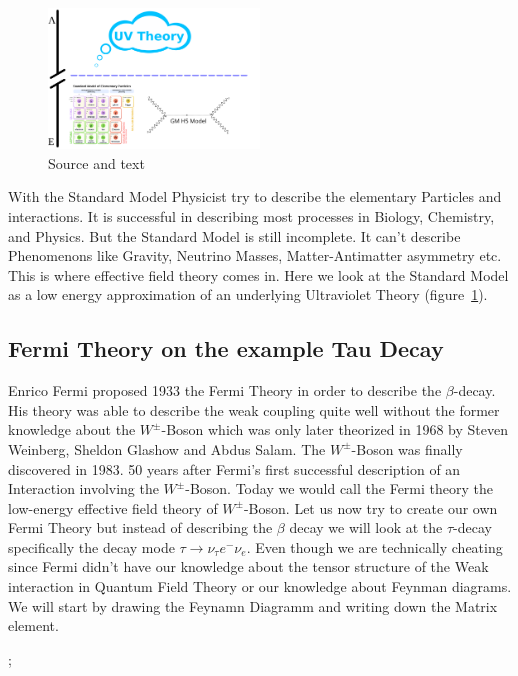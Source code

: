\documentclass[../Bachelorarbeit.tex]{subfiles}
\begin{document}
\label{sec:EFT}

\begin{figure}[h]
    \centering
    \includegraphics[width=0.5\textwidth]{images/EFT_Model.png}
    \caption{Source and text \cite{Brivio.2017}}
    \label{fig:EFT_sketch}
\end{figure}

With the Standard Model Physicist try to describe the elementary Particles and interactions. It is successful in describing most processes in Biology, Chemistry, and Physics.
But the Standard Model is still incomplete. It can't describe Phenomenons like Gravity, Neutrino Masses, Matter-Antimatter asymmetry etc. This is where effective field theory comes in.
Here we look at the Standard Model as a low energy approximation of an underlying Ultraviolet Theory (figure~\ref{fig:EFT_sketch}).

\subsection{Fermi Theory on the example Tau Decay}
\label{sec:Fermi}
Enrico Fermi proposed 1933 the Fermi Theory in order to describe the $\beta$-decay. His theory was able to describe the
weak coupling quite well without the former knowledge about the $W^{\pm}$-Boson which was only later theorized in 1968 by Steven Weinberg, Sheldon Glashow and Abdus Salam.
The $W^{\pm}$-Boson was finally discovered in 1983. 50 years after Fermi's first successful description of an Interaction involving the $W^{\pm}$-Boson.
Today we would call the Fermi theory the low-energy effective field theory of $W^{\pm}$-Boson.
Let us now try to create our own Fermi Theory but instead of describing the $\beta$ decay we will look at the $\tau$-decay specifically the decay mode $\tau \rightarrow \nu_{\tau}e^{-}\nu_{e}$.
Even though we are technically cheating since Fermi didn't have our knowledge about the tensor structure of the Weak interaction in Quantum Field Theory or our knowledge about Feynman diagrams.
We will start by drawing the Feynamn Diagramm and writing down the Matrix element.
\begin{center}
    ;
\end{center}
\end{document}
